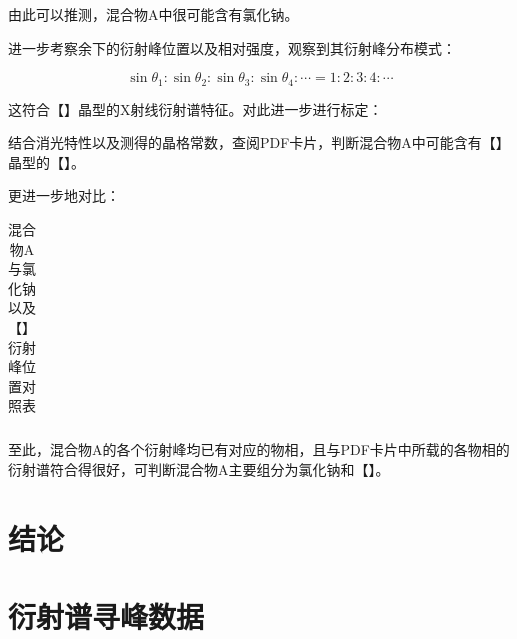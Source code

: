 \documentclass{thuemp}
\begin{document}
由此可以推测，混合物A中很可能含有氯化钠。

进一步考察余下的衍射峰位置以及相对强度，观察到其衍射峰分布模式：

\begin{equation}
    \sin{\theta_1} : \sin{\theta_2} :\sin{\theta_3} : \sin{\theta_4} : \cdots = 1 : 2 : 3 : 4 : \cdots
    \label{eq:mixture_a_diff_patt}
\end{equation}

这符合【】晶型的X射线衍射谱特征。对此进一步进行标定：

结合消光特性以及测得的晶格常数，查阅PDF卡片，判断混合物A中可能含有【】晶型的【】。

更进一步地对比：

\begin{table}[H]
    \centering
    \captionnamefont{\wuhao\bf\heiti}
    \captiontitlefont{\wuhao\bf\heiti}
    \caption{混合物A与氯化钠以及【】衍射峰位置对照表}
    \label{tab:mixture_a_unknow_peaks}
    \liuhao
    \begin{tabular}{ccccc}
        \toprule
        \midrule
        \bottomrule
    \end{tabular}
\end{table}

至此，混合物A的各个衍射峰均已有对应的物相，且与PDF卡片中所载的各物相的衍射谱符合得很好，可判断混合物A主要组分为氯化钠和【】。

\section{结论}



\renewcommand\refname{\heiti\wuhao\centerline{参考文献}\global\def\refname{参考文献}}
\vskip 12pt


\let\OLDthebibliography\thebibliography
\renewcommand\thebibliography[1]{
  \OLDthebibliography{#1}
  \setlength{\parskip}{0pt}
  \setlength{\itemsep}{0pt plus 0.3ex}
}

{
\renewcommand{\baselinestretch}{0.9}
\liuhao


}

\appendix
\section{衍射谱寻峰数据}
\end{document}
